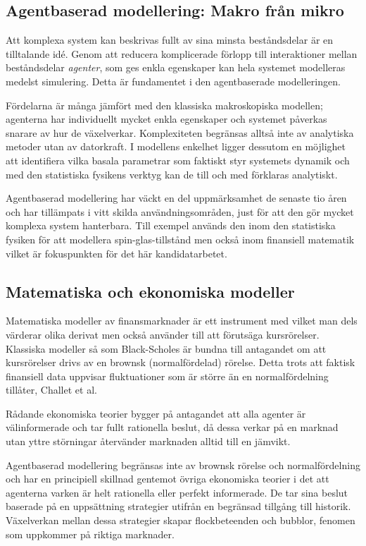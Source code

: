 \subsection{Agentbaserad modellering: Makro från mikro}
Att komplexa system kan beskrivas fullt av sina minsta beståndsdelar är en tilltalande idé. Genom att reducera komplicerade förlopp till interaktioner mellan beståndsdelar \textit{agenter}, som ges enkla egenskaper kan hela systemet modelleras medelst simulering. Detta är fundamentet i den agentbaserade modelleringen.

Fördelarna är många jämfört med den klassiska makroskopiska modellen; agenterna har individuellt mycket enkla egenskaper och systemet påverkas snarare av hur de växelverkar. Komplexiteten begränsas alltså inte av analytiska metoder utan av datorkraft. I modellens enkelhet ligger dessutom en möjlighet att identifiera vilka basala parametrar som faktiskt styr systemets dynamik och med den statistiska fysikens verktyg kan de till och med förklaras analytiskt.

Agentbaserad modellering har väckt en del uppmärksamhet de senaste tio åren och har tillämpats i vitt skilda användningsområden, just för att den gör mycket komplexa system hanterbara. Till exempel används den inom den statistiska fysiken för att modellera spin-glas-tillstånd men också inom finansiell matematik vilket är fokuspunkten för det här kandidatarbetet.

\subsection{Matematiska och ekonomiska modeller}

Matematiska modeller av finansmarknader är ett instrument med vilket man dels värderar olika derivat men också använder till att förutsäga kursrörelser. Klassiska modeller så som Black-Scholes är bundna till antagandet om att kursrörelser drivs av en brownsk (normalfördelad) rörelse. Detta trots att faktisk finansiell data uppvisar fluktuationer som är större än en normalfördelning tillåter, Challet et al\cite{AnomalousFluctuations}. 

Rådande ekonomiska teorier bygger på antagandet att alla agenter är välinformerade och tar fullt rationella beslut, då dessa verkar på en marknad utan yttre störningar återvänder marknaden alltid till en jämvikt\cite{NeoClassicalEconomics}.

Agentbaserad modellering begränsas inte av brownsk rörelse och normalfördelning och har en principiell skillnad gentemot övriga ekonomiska teorier i det att agenterna varken är helt rationella eller perfekt informerade. De tar sina beslut baserade på en uppsättning strategier utifrån en begränsad tillgång till historik. Växelverkan mellan dessa strategier skapar flockbeteenden och bubblor, fenomen som uppkommer på riktiga marknader.
